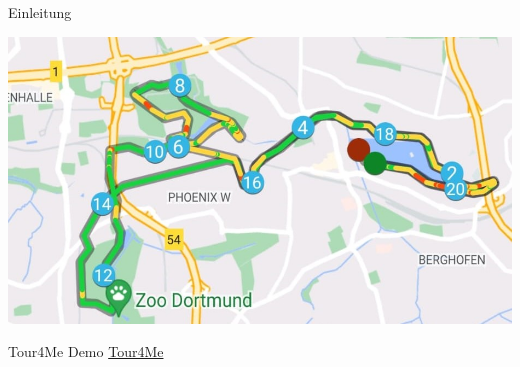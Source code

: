 \documentclass[aspectratio=169,xcolor=dvipsnames, t]{beamer}
\begin{document}
\begin{frame}{Einleitung}
\begin{minipage}[t][0.7\textheight][b]{0.48\textwidth}
{\begin{flushright}
				\end{flushright}
				\begin{flushleft}
					\includegraphics[height=0.3\textheight]{images/laufstrecke_komplex.jpg}
				\end{flushleft}}
		\end{minipage}
	\end{frame}
	
	\begin{frame}{Tour4Me Demo}
	\centering
	\vspace{2cm}
	\Huge \href{http://tour4me.cs.tu-dortmund.de/} {Tour4Me}
	\end{frame}
	
\end{document}
